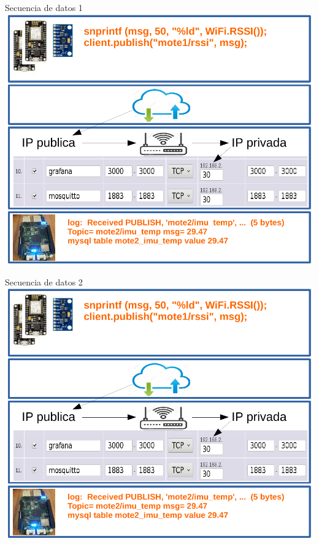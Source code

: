 \documentclass[aspectratio= 43]{beamer}
\begin{document}
\begin{frame}{Secuencia de datos 1}
   \centering \includegraphics [scale=0.62,page=1]{./visio/secuence.pdf}
\end{frame}
\begin{frame}{Secuencia de datos 2}
   \centering \includegraphics [scale=0.62,page=2]{./visio/secuence.pdf}
\end{frame}
\end{document}
